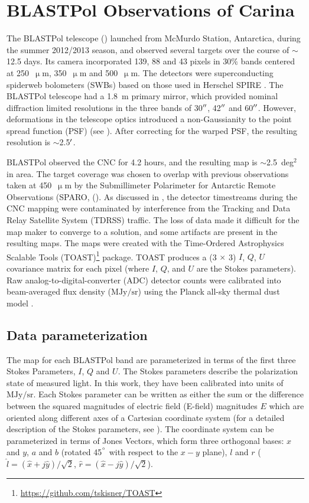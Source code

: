 \section{BLASTPol Observations of Carina}\label{observations}
The BLASTPol telescope (\citet{galitzki2014balloon}) launched from McMurdo Station, Antarctica, during the summer 2012/2013 season, and observed several targets over the course of $\sim$12.5 days. Its camera incorporated 139, 88 and 43 pixels in 30$\%$ bands centered at 250~$\upmu$m, 350~$\upmu$m and 500~$\upmu$m. The detectors were superconducting spiderweb bolometers (SWBs) based on those used in Herschel SPIRE \citep{griffin2003spire}.
The BLASTPol telescope had a 1.8~m primary mirror, which provided nominal diffraction limited resolutions in the three bands of 30$\operatorname{^{\prime\prime}}$, 42$\operatorname{^{\prime\prime}}$ and 60$\operatorname{^{\prime\prime}}$. However, deformations in the telescope optics introduced a non-Gaussianity to the point spread function (PSF) (see \citet{fissel2016balloon}). After correcting for the warped PSF, the resulting resolution is $\sim$2.5$\operatorname{^{\prime}}$.

BLASTPol observed the CNC for 4.2 hours, and the resulting map is $\sim$2.5~deg$^{2}$ in area. The target coverage was chosen to overlap with previous observations taken at 450~$\upmu$m by the Submillimeter Polarimeter for Antarctic Remote Observations (SPARO, (\citet{li2006results,li2006results}). As discussed in \citet{benton2015mapping}, the detector timestreams during the CNC mapping were contaminated by interference from the Tracking and Data Relay Satellite System (TDRSS) traffic. The loss of data made it difficult for the map maker to converge to a solution, and some artifacts are present in the resulting maps. The maps were created with the Time-Ordered Astrophysics Scalable Tools (TOAST)\footnote{\url{https://github.com/tskisner/TOAST}} package. TOAST produces a (3 $\times$ 3) $I$, $Q$, $U$ covariance matrix for each pixel (where $I$, $Q$, and $U$ are the Stokes parameters). Raw analog-to-digital-converter (ADC) detector counts were calibrated into beam-averaged flux density ($\mathrm{MJy}/\mathrm{sr}$) using the Planck all-sky thermal dust model \citep{ade2015planck}.

\subsection{Data parameterization}

The map for each BLASTPol band are parameterized in terms of the first three Stokes Parameters, $I$, $Q$ and $U$. The Stokes parameters describe the polarization state of measured light. In this work, they have been calibrated into units of $\mathrm{MJy}/\mathrm{sr}$. Each Stokes parameter can be written as either the sum or the difference between the squared magnitudes of electric field (E-field) magnitudes $E$ which are oriented along different axes of a Cartesian coordinate system (for a detailed description of the Stokes parameters, see \citet{hecht2002optics}). The coordinate system can be parameterized in terms of Jones Vectors, which form three orthogonal bases: $x$ and $y$, $a$ and $b$ (rotated 45$^{\degree}$ with respect to the $x-y$ plane), $l$ and $r$ ($\hat{l} = (\hat{x} + j\hat{y})/\sqrt{2}$, $\hat{r} = (\hat{x} - j\hat{y})/\sqrt{2}$).

